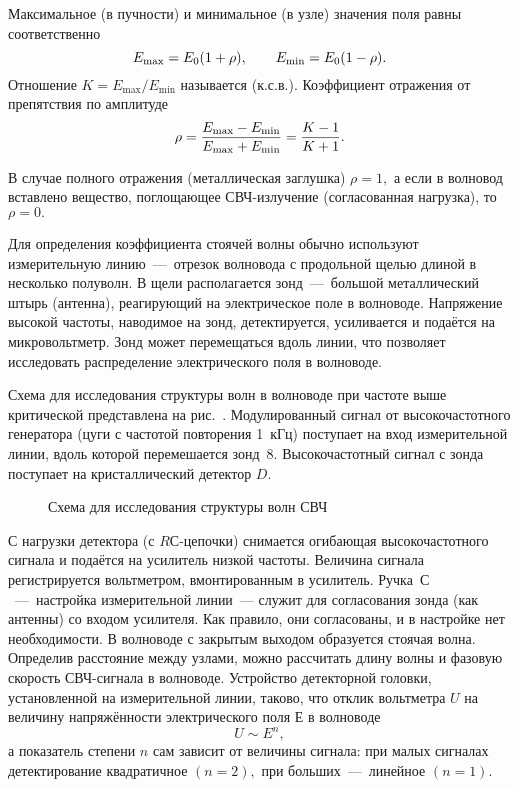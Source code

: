 Максимальное (в пучности) и минимальное (в узле) значения поля равны соответственно
\begin{equation}
	\eqmark{2.0.5}
	E_{\text{max}}=E_0(1+\rho), \qquad E_{\text{min}}=E_0(1-\rho).
\end{equation}
Отношение $K=E_{\text{max}}/E_{\text{min}}$ называется  (к.с.в.). Коэффициент отражения от препятствия по амплитуде
\begin{equation}
	\eqmark{2.0.6}
	\rho=\dfrac{E_{\text{max}}-E_{\text{min}}}{E_{\text{max}}+E_{\text{min}}}=\dfrac{K-1}{K+1}.
\end{equation}

В случае полного отражения (металлическая заглушка) $\rho=1,$ а если в волновод вставлено вещество, поглощающее СВЧ-­излучение (согласованная нагрузка), то $\rho=0.$

Для определения коэффициента стоячей волны обычно используют измерительную линию~---~отрезок волновода с продольной щелью длиной в несколько полуволн. В щели располагается зонд~---~большой металлический штырь (антенна), реагирующий на электрическое поле в волноводе. Напряжение высокой частоты, наводимое на зонд, детектируется, усиливается и подаётся на микровольтметр. Зонд может перемещаться вдоль линии, что позволяет исследовать распределение электрического поля в волноводе.


\experiment
Схема для исследования структуры волн в волноводе при частоте выше критической представлена на рис.~. Модулированный сигнал от высокочастотного генератора (цуги с частотой повторения 1~кГц) поступает на вход измерительной линии, вдоль которой перемешается зонд~8. Высокочастотный сигнал с зонда поступает на кристаллический детектор $D$.

\begin{figure}[h!]
	\caption{Схема для исследования структуры волн СВЧ}
\end{figure}

С нагрузки детектора (с $RС$-цепочки) снимается огибающая высокочастотного сигнала и подаётся на усилитель низкой частоты. Величина сигнала регистрируется вольтметром, вмонтированным в усилитель. Ручка~$С$~---~настройка измерительной линии~--- служит для согласования зонда (как антенны) со входом усилителя. Как правило, они согласованы, и в настройке нет необходимости. В волноводе с закрытым выходом образуется стоячая волна. Определив расстояние между узлами, можно рассчитать длину волны и фазовую скорость СВЧ-сигнала в волноводе. Устройство детекторной головки, установленной на измерительной линии, таково, что отклик вольтметра $U$ на величину напряжённости электрического поля $Е$ в волноводе 
\begin{equation*}
	U\sim E^{n},
\end{equation*}
а показатель степени $n$ сам зависит от величины сигнала: при малых сигналах детектирование квадратичное $(n=2),$ при больших~---~линейное $(n=1).$

